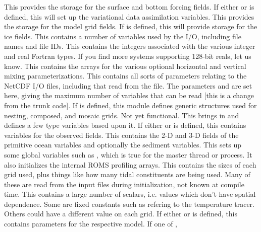 \begin{klist}
   This
    provides the storage for the surface and bottom forcing fields.
   If either  or 
    is defined, this will set up the variational data assimilation
    variables.
   This provides the storage for the model grid fields. 
   If  is defined, this will provide
    storage for the ice fields.
   This contains a number of variables used by the
    I/O, including file names and file IDs.
    This contains the integers associated with the
    various integer and real Fortran types. If you find more systems
    supporting 128-bit reals, let us know.
   This contains the arrays for the various
    optional horizontal and vertical mixing parameterizations.
   This contains all sorts of parameters relating to
    the NetCDF I/O files, including that read from the 
    file. The parameters  and  are set here, giving
    the maximum number of variables that can be read [this is a change
    from the trunk code].
   If  is defined, this module defines
    generic structures used for nesting, composed, and mosaic grids. Not
    yet functional.
   This brings in  and defines a few
    type variables based upon it.
   If either  or 
    is defined, this contains variables for the observed fields.
   This contains the 2-D and 3-D fields of the primitive
    ocean variables and optionally the sediment variables.
   This sets up some global variables such as
    , which is true for the master thread or
    process. It also initializes the internal ROMS profiling arrays.
   This contains the sizes of each grid used, plus
    things like how many tidal constituents are being used. Many of these are
    read from the input files during initialization, not known at compile
    time.
   This contains a large number of scalars, i.e. values
    which don't have spatial dependence. Some are fixed constants such
    as  refering to the temperature tracer. Others could
    have a different value on each grid.
   If either  or 
    is defined, this contains parameters for the respective model.
   If one of , 

\end{klist}
